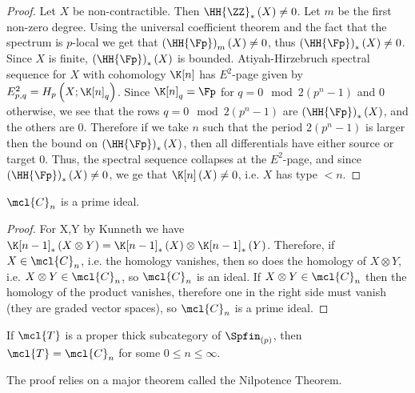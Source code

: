 \begin{proof}
	Let $X$ be non-contractible.
	Then $\HH{\ZZ}_*\left(X\right) \neq 0$.
	Let $m$ be the first non-zero degree.
	Using the universal coefficient theorem and the fact that the spectrum is $p$-local we get that $\left(\HH{\Fp}\right)_m\left(X\right) \neq 0$, thus $\left(\HH{\Fp}\right)_*\left(X\right) \neq 0$.
	Since $X$ is finite, $\left(\HH{\Fp}\right)_*\left(X\right)$ is bounded.
	Atiyah-Hirzebruch spectral sequence for $X$ with cohomology $\K[n]$ has $E^2$-page given by
	$
	E_{p,q}^2
	= 
	H_p\left(X; \K[n]_q\right)
	$.
	Since $\K[n]_q = \Fp$ for $q = 0 \mod 2\left(p^n-1\right)$ and $0$ otherwise,
	we see that the rows $q = 0 \mod 2\left(p^n-1\right)$ are $\left(\HH{\Fp}\right)_*\left(X\right)$, and the others are $0$.
	Therefore if we take $n$ such that the period $2\left(p^n-1\right)$ is larger then the bound on $\left(\HH{\Fp}\right)_*\left(X\right)$, then all differentials have either source or target $0$.
	Thus, the spectral sequence collapses at the $E^2$-page, and since $\left(\HH{\Fp}\right)_*\left(X\right) \neq 0$, we ge that $\K[n]\left(X\right) \neq 0$, i.e. $X$ has type $<n$.
\end{proof}

\begin{proposition}
	$\mcl{C}_n$ is a prime ideal.
\end{proposition}

\begin{proof}
	For X,Y by Kunneth we have $\K[n-1]_*\left(X \otimes  Y\right) = \K[n-1]_*\left(X\right) \otimes \K[n-1]_*\left(Y\right)$.
	Therefore, if $X \in \mcl{C}_n$, i.e. the homology vanishes, then so does the homology of $X \otimes Y$, i.e. $X \otimes Y \in \mcl{C}_n$, so $\mcl{C}_n$ is an ideal.
	If $X \otimes Y\in \mcl{C}_n$ then the homology of the product vanishes, therefore one in the right side must vanish (they are graded vector spaces), so $\mcl{C}_n$ is a prime ideal.
\end{proof}

\begin{theorem}
	If $\mcl{T}$ is a proper thick subcategory of $\Spfin_{\left(p\right)}$, then $\mcl{T} = \mcl{C}_n$ for some $0 \leq n \leq \infty$.
\end{theorem}

\begin{remark}
	The proof relies on a major theorem called the Nilpotence Theorem.
\end{remark}

